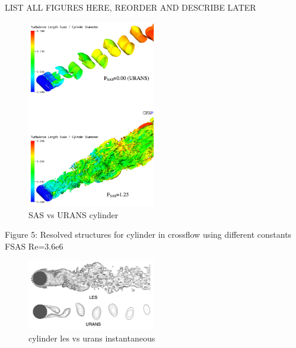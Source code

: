 \documentclass[journal]{new-aiaa}
\begin{document}
LIST ALL FIGURES HERE, REORDER AND DESCRIBE LATER


\begin{figure}[H]
\begin{center}
\includegraphics[width=0.5\textwidth]{Images/logan/menter2005scaleadaptive_cylinderwake2.pdf}
\caption{ SAS vs URANS cylinder \cite{menter2005scaleadaptive} }
\label{fig:sasvsuranscylinder}
\end{center}
\end{figure}

Figure 5: Resolved structures for cylinder in crossflow using different constants FSAS Re=3.6e6




\begin{figure}[H]
\begin{center}
\includegraphics[width=0.5\textwidth]{Images/logan/catalano_2003numerical_UnsteadyURANSvsLES.pdf}
\caption{ cylinder les vs urans instantaneous \cite{catalano2003numerical} }
\label{fig:lesvsuranscylinderinstant}
\end{center}
\end{figure}
\end{document}
